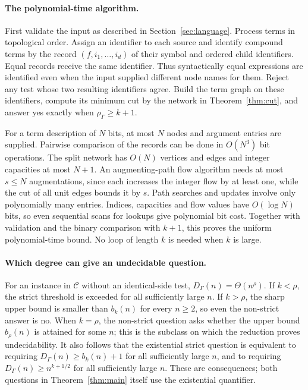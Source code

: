 \documentclass[12pt]{article}
\theoremstyle{definition}
\begin{document}
\paragraph{The polynomial-time algorithm.}
First validate the input as described in Section~\ref{sec:language}.
Process terms in topological order. Assign an identifier to each source
and identify compound terms by the record $(f,i_1,\ldots,i_d)$ of their
symbol and ordered child identifiers. Equal records receive the same
identifier. Thus syntactically equal expressions are identified even
when the input supplied different node names for them.
Reject any test whose two resulting identifiers agree. Build the term
graph on these identifiers, compute its minimum cut by the network in
Theorem~\ref{thm:cut}, and answer yes exactly when $\rho_\Gamma\ge k+1$.

For a term description of $N$ bits, at most $N$ nodes and argument
entries are supplied. Pairwise comparison of the records can be done
in $O(N^3)$ bit operations. The split network has $O(N)$ vertices and
edges and integer capacities at most $N+1$. An augmenting-path flow
algorithm needs at most $s\le N$ augmentations, since each increases
the integer flow by at least one, while the cut of all unit edges
bounds it by $s$. Path searches and updates involve only polynomially
many entries. Indices, capacities and flow values have $O(\log N)$
bits, so even sequential scans for lookups give polynomial bit cost.
Together with validation and the binary comparison with $k+1$, this
proves the uniform polynomial-time bound. No loop of length $k$ is
needed when $k$ is large.

\paragraph{Which degree can give an undecidable question.}
For an instance in $\mathcal C$ without an identical-side test,
$D_\Gamma(n)=\Theta(n^\rho)$. If $k<\rho$, the strict threshold is
exceeded for all sufficiently large $n$. If $k>\rho$, the sharp upper
bound is smaller than $b_k(n)$ for every $n\ge2$, so even the non-strict
answer is no. When $k=\rho$, the non-strict question asks whether the
upper bound $b_\rho(n)$ is attained for some $n$; this is the subclass
on which the reduction proves undecidability.
It also follows that the existential strict question is equivalent
to requiring $D_\Gamma(n)\ge b_k(n)+1$ for all sufficiently large $n$,
and to requiring $D_\Gamma(n)\ge n^{k+1/2}$ for all sufficiently large
$n$. These are consequences; both questions in Theorem~\ref{thm:main}
itself use the existential quantifier.
\end{document}
